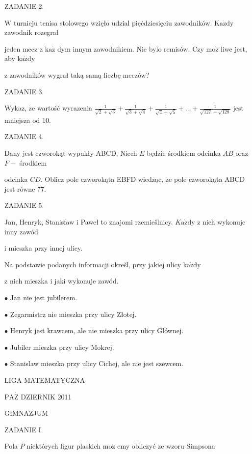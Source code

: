 \documentclass[a4paper,12pt]{article}
\begin{document}
ZADANIE 2.

$\mathrm{W}$ turnieju tenisa stolowego wzięło udzial pięćdziesięciu zawodników. $\mathrm{K}\mathrm{a}\dot{\mathrm{z}}\mathrm{d}\mathrm{y}$ zawodnik rozegrał

jeden mecz z $\mathrm{k}\mathrm{a}\dot{\mathrm{z}}$ dym innym zawodnikiem. Nie bylo remisów. Czy $\mathrm{m}\mathrm{o}\dot{\mathrm{z}}$ liwe jest, aby $\mathrm{k}\mathrm{a}\dot{\mathrm{z}}\mathrm{d}\mathrm{y}$

z zawodników wygrał taką samą liczbę meczów?

ZADANIE 3.

Wykaz, $\dot{\mathrm{z}}\mathrm{e}$ wartość wyrazenia $\displaystyle \frac{1}{\sqrt{2}+\sqrt{3}}+\frac{1}{\sqrt{3}+\sqrt{4}}+\frac{1}{\sqrt{4}+\sqrt{5}}+\ldots+\frac{1}{\sqrt{127}+\sqrt{128}}$ jest mniejsza od 10.

ZADANIE 4.

Dany jest czworokąt wypukły ABCD. Niech $E$ będzie środkiem odcinka $AB$ oraz $F-$ środkiem

odcinka $CD$. Oblicz pole czworokąta EBFD wiedząc, $\dot{\mathrm{z}}\mathrm{e}$ pole czworokąta ABCD jest równe 77.

ZADANIE 5.

Jan, Henryk, Stanisfaw i Paweł to znajomi rzemiešlnicy. $K\mathrm{a}\dot{\mathrm{z}}\mathrm{d}\mathrm{y}$ z nich wykonuje inny zawód

i mieszka przy innej ulicy.

Na podstawie podanych informacji okrešl, przy jakiej ulicy $\mathrm{k}\mathrm{a}\dot{\mathrm{z}}\mathrm{d}\mathrm{y}$

z nich mieszka i jaki wykonuje zawód.

$\bullet$ Jan nie jest jubilerem.

$\bullet$ Zegarmistrz nie mieszka przy ulicy Złotej.

$\bullet$ Henryk jest krawcem, ale nie mieszka przy ulicy Glównej.

$\bullet$ Jubiler mieszka przy ulicy Mokrej.

$\bullet$ Stanislaw mieszka przy ulicy Cichej, ale nie jest szewcem.






LIGA MATEMATYCZNA

$\mathrm{P}\mathrm{A}\acute{\mathrm{Z}}$ DZIERNIK 2011

GIMNAZJUM

ZADANIE I.

Pola $P$ niektórych figur plaskich $\mathrm{m}\mathrm{o}\dot{\mathrm{z}}$ emy obliczyć ze wzoru Simpsona
\end{document}
